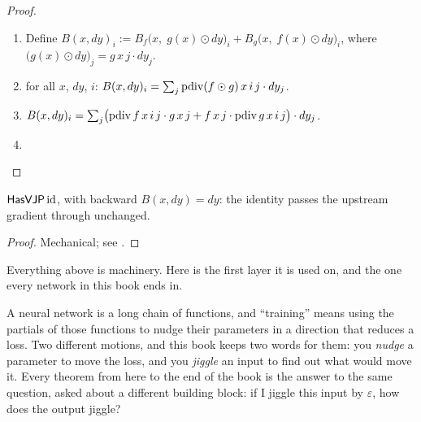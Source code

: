 \begin{proof}
\leanok
\begin{enumerate}
  \item Define \(B(x, dy)_i
          := B_f\bigl(x,\; g(x) \odot dy\bigr)_i
          + B_g\bigl(x,\; f(x) \odot dy\bigr)_i\),
    where \(\bigl(g(x) \odot dy\bigr)_j = g\,x\,j \cdot dy_j\).
  \item \Suffices{} for all \(x\), \(dy\), \(i\):
    \(B(x, dy)_i = \sum_j \operatorname{pdiv}(f \odot g)\, x\, i\, j \cdot dy_j\).
  \item \(B(x, dy)_i = \sum_j \bigl(\operatorname{pdiv} f\, x\, i\, j \cdot g\,x\,j
          + f\,x\,j \cdot \operatorname{pdiv} g\, x\, i\, j\bigr) \cdot dy_j\).
  \item \Qed{}
\end{enumerate}
\end{proof}

\begin{theorem}
  \label{thm:identityHasVJP}
  \leanok
  \(\mathsf{HasVJP}\, \mathrm{id}\), with backward \(B(x, dy) = dy\): the
  identity passes the upstream gradient through unchanged.
\end{theorem}

\begin{proof}
\leanok
Mechanical; see .
\end{proof}


Everything above is machinery. Here is the first layer it is used on,
and the one every network in this book ends in.

A neural network is a long chain of functions, and ``training'' means
using the partials of those functions to nudge their parameters in a
direction that reduces a loss. Two different motions, and this book
keeps two words for them: you \emph{nudge} a parameter to move the loss,
and you \emph{jiggle} an input to find out what would move it. Every
theorem from here to the end of the book is the answer to the same
question, asked about a different building block: if I jiggle
this input by \(\varepsilon\), how does the output jiggle?

